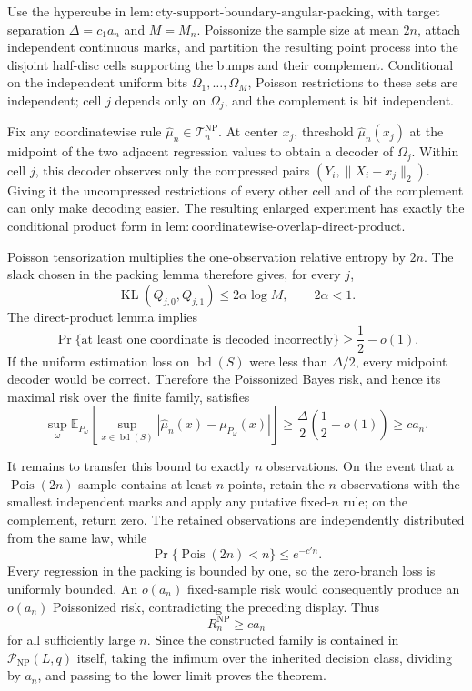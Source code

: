 Use the hypercube in \(\mathrm{lem:cty\text{-}support\text{-}boundary\text{-}angular\text{-}packing}\), with target separation \(\Delta=c_1a_n\) and \(M=M_n\).  Poissonize the sample size at mean \(2n\), attach independent continuous marks, and partition the resulting point process into the disjoint half-disc cells supporting the bumps and their complement.  Conditional on the independent uniform bits \(\Omega_1,\ldots,\Omega_M\), Poisson restrictions to these sets are independent; cell \(j\) depends only on \(\Omega_j\), and the complement is bit independent.

Fix any coordinatewise rule \(\widehat\mu_n\in\mathcal T_n^{\mathrm{NP}}\).  At center \(x_j\), threshold \(\widehat\mu_n(x_j)\) at the midpoint of the two adjacent regression values to obtain a decoder of \(\Omega_j\).  Within cell \(j\), this decoder observes only the compressed pairs \((Y_i,\lVert X_i-x_j\rVert_2)\).  Giving it the uncompressed restrictions of every other cell and of the complement can only make decoding easier.  The resulting enlarged experiment has exactly the conditional product form in \(\mathrm{lem:coordinatewise\text{-}overlap\text{-}direct\text{-}product}\).

Poisson tensorization multiplies the one-observation relative entropy by \(2n\).  The slack chosen in the packing lemma therefore gives, for every \(j\),
\[
 \operatorname{KL}(Q_{j,0},Q_{j,1})
 \leq2\alpha\log M,
 \qquad 2\alpha<1.
\]
The direct-product lemma implies
\[
 \Pr\{\text{at least one coordinate is decoded incorrectly}\}
 \geq\frac12-o(1).
\]
If the uniform estimation loss on \(\operatorname{bd}(S)\) were less than \(\Delta/2\), every midpoint decoder would be correct.  Therefore the Poissonized Bayes risk, and hence its maximal risk over the finite family, satisfies
\[
 \sup_\omega\mathbb E_{P_\omega}\!\left[
 \sup_{x\in\operatorname{bd}(S)}
 |\widehat\mu_n(x)-\mu_{P_\omega}(x)|
 \right]
 \geq\frac{\Delta}{2}\left(\frac12-o(1)\right)
 \geq c a_n.
\]

It remains to transfer this bound to exactly \(n\) observations.  On the event that a \(\operatorname{Pois}(2n)\) sample contains at least \(n\) points, retain the \(n\) observations with the smallest independent marks and apply any putative fixed-\(n\) rule; on the complement, return zero.  The retained observations are independently distributed from the same law, while
\[
 \Pr\{\operatorname{Pois}(2n)<n\}\leq e^{-c'n}.
\]
Every regression in the packing is bounded by one, so the zero-branch loss is uniformly bounded.  An \(o(a_n)\) fixed-sample risk would consequently produce an \(o(a_n)\) Poissonized risk, contradicting the preceding display.  Thus
\[
 R_n^{\mathrm{NP}}\geq c a_n
\]
for all sufficiently large \(n\).  Since the constructed family is contained in \(\mathcal P_{\mathrm{NP}}(L,q)\) itself, taking the infimum over the inherited decision class, dividing by \(a_n\), and passing to the lower limit proves the theorem.